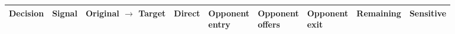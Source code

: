\documentclass[10pt,border=8pt,varwidth=7.5in]{standalone}
\begin{document}
\begin{minipage}{7.5in}{\fontsize{9.5}{11.5}\selectfont\begin{tabularx}{\linewidth}{@{}>{\raggedright\arraybackslash}p{1.35in}>{\centering\arraybackslash}p{.45in}>{\centering\arraybackslash}p{1.05in}*{5}{>{\centering\arraybackslash}X}>{\centering\arraybackslash}p{.65in}@{}}
\toprule Decision & Signal & Original $\to$ Target & Direct & \shortstack{Opponent\\entry} & \shortstack{Opponent\\offers} & \shortstack{Opponent\\exit} & Remaining & Sensitive \\\midrule
\bottomrule\end{tabularx}}\end{minipage}
\end{document}
